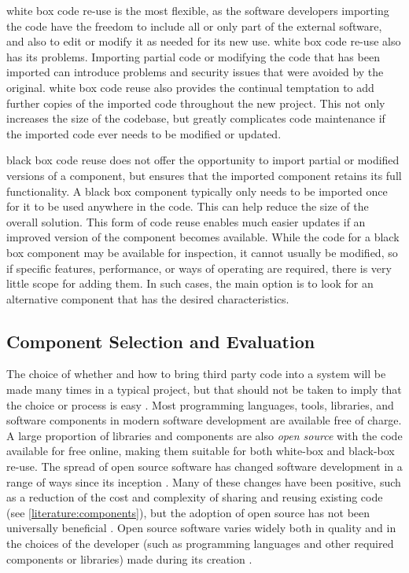 \Gls{white box} code re-use is the most flexible, as the software developers importing the code have the freedom to include all or only part of the external software, and also to edit or modify it as needed for its new use. \Gls{white box} code re-use also has its problems. Importing partial code or modifying the code that has been imported can introduce problems and security issues that were avoided by the original. \Gls{white box} code reuse also provides the continual temptation to add further copies of the imported code throughout the new project. This not only increases the size of the codebase, but greatly complicates code maintenance if the imported code ever needs to be modified or updated.

\label{A47a}
\Gls{black box} code reuse does not offer the opportunity to import partial or modified versions of a component, but ensures that the imported component retains its full functionality. A \gls{black box} component typically only needs to be imported once for it to be used anywhere in the code. This can help reduce the size of the overall solution. This form of code reuse enables much easier updates if an improved version of the component becomes available. While the code for a \gls{black box} component may be available for inspection, it cannot usually be modified, so if specific features, performance, or ways of operating are required, there is very little scope for adding them. In such cases, the main option is to look for an alternative component that has the desired characteristics.

\subsection{Component Selection and Evaluation}
\label{IN3}

The choice of whether and how to bring third party code into a system will be made many times in a typical project, but that should not be taken to imply that the choice or process is easy \citep{Nazir2014} \citep{Badampudi2017} \citep{Paschali2017}. Most \gls{programming language}s, tools, libraries, and software components in modern software development are available free of charge. A large proportion of libraries and components are also \emph{open source} \citep{Androutsellis-Theotokis2011} with the code available for free online, making them suitable for both white-box and black-box re-use. The spread of open source software has changed software development in a range of ways since its inception \citep{Gonzalez-Barahona2021}. Many of these changes have been positive, such as a reduction of the cost and complexity of sharing and reusing existing code (see \autoref{literature:components}), but the adoption of open source has not been universally beneficial \citep{Vasilescu2013}. Open source software varies widely both in quality and in the choices of the developer (such as \gls{programming language}s and other required components or libraries) made during its creation \citep{Bissyande2013}.

